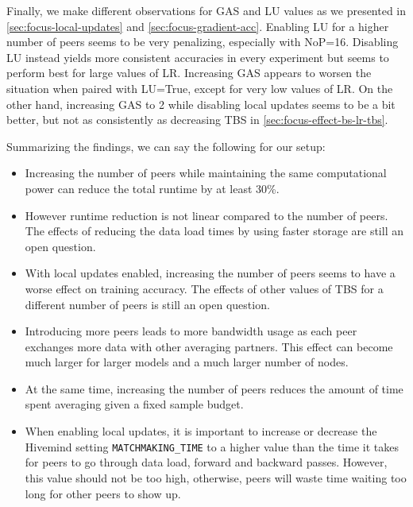 Finally, we make different observations for GAS and LU values as we presented in \autoref{sec:focus-local-updates} and \autoref{sec:focus-gradient-acc}.
Enabling LU for a higher number of peers seems to be very penalizing, especially with NoP=16.
Disabling LU instead yields more consistent accuracies in every experiment but seems to perform best for large values of LR.
Increasing GAS appears to worsen the situation when paired with LU=True, except for very low values of LR.
On the other hand, increasing GAS to 2 while disabling local updates seems to be a bit better, but not as consistently as decreasing TBS in \autoref{sec:focus-effect-bs-lr-tbs}.

Summarizing the findings, we can say the following for our setup:
\begin{itemize}
    \item Increasing the number of peers while maintaining the same computational power can reduce the total runtime by at least 30\%.
    \item However runtime reduction is not linear compared to the number of peers.
          The effects of reducing the data load times by using faster storage are still an open question.
    \item With local updates enabled, increasing the number of peers seems to have a worse effect on training accuracy.
          The effects of other values of TBS for a different number of peers is still an open question.
    \item Introducing more peers leads to more bandwidth usage as each peer exchanges more data with other averaging partners.
          This effect can become much larger for larger models and a much larger number of nodes.
    \item At the same time, increasing the number of peers reduces the amount of time spent averaging given a fixed sample budget.
    \item When enabling local updates, it is important to increase or decrease the Hivemind setting \texttt{MATCHMAKING\_TIME} to a higher value than the time it takes for peers to go through data load, forward and backward passes.
          However, this value should not be too high, otherwise, peers will waste time waiting too long for other peers to show up.
\end{itemize}
